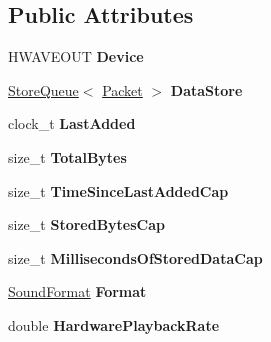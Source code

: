 \subsection*{Public Attributes}
\begin{DoxyCompactItemize}
\item 
\hypertarget{classcl_output_device_a906a28d7d033192dee0aed05f5e7140b}{
HWAVEOUT {\bfseries Device}}
\label{classcl_output_device_a906a28d7d033192dee0aed05f5e7140b}

\item 
\hypertarget{classcl_output_device_a7eb42c9f7cf5769a5ce1dae4a5ed42c1}{
\hyperlink{class_store_queue}{StoreQueue}$<$ \hyperlink{class_packet}{Packet} $>$ {\bfseries DataStore}}
\label{classcl_output_device_a7eb42c9f7cf5769a5ce1dae4a5ed42c1}

\item 
\hypertarget{classcl_output_device_afa3bd7fd5e3bbb26619f5caf8e84d383}{
clock\_\-t {\bfseries LastAdded}}
\label{classcl_output_device_afa3bd7fd5e3bbb26619f5caf8e84d383}

\item 
\hypertarget{classcl_output_device_a12228d6ac3f6c6fbeaaeb77faea30886}{
size\_\-t {\bfseries TotalBytes}}
\label{classcl_output_device_a12228d6ac3f6c6fbeaaeb77faea30886}

\item 
\hypertarget{classcl_output_device_a098de644f25d7017db0720cf85c045f3}{
size\_\-t {\bfseries TimeSinceLastAddedCap}}
\label{classcl_output_device_a098de644f25d7017db0720cf85c045f3}

\item 
\hypertarget{classcl_output_device_a1b0651fbc848c59aaa9fb86e3cd53f30}{
size\_\-t {\bfseries StoredBytesCap}}
\label{classcl_output_device_a1b0651fbc848c59aaa9fb86e3cd53f30}

\item 
\hypertarget{classcl_output_device_a8fad7ae74d61adcf88d84f09945267f6}{
size\_\-t {\bfseries MillisecondsOfStoredDataCap}}
\label{classcl_output_device_a8fad7ae74d61adcf88d84f09945267f6}

\item 
\hypertarget{classcl_output_device_aee70348888a14b5e555b0f3d5e4460f7}{
\hyperlink{class_sound_format}{SoundFormat} {\bfseries Format}}
\label{classcl_output_device_aee70348888a14b5e555b0f3d5e4460f7}

\item 
\hypertarget{classcl_output_device_a0ba2d424e5ebe790fd604c5ee9b31a55}{
double {\bfseries HardwarePlaybackRate}}
\label{classcl_output_device_a0ba2d424e5ebe790fd604c5ee9b31a55}


\end{DoxyCompactItemize}
